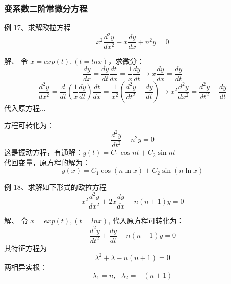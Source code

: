 \begin{frame}
\frametitle{变系数二阶常微分方程}
	\begin{exampleblock} 	{例 17、求解欧拉方程}
	\begin{equation*}
		x^2 \frac{d^2 y}{d x^2} +x \frac{d y}{d x} +n^2 y =0 
	\end{equation*}     
	\end{exampleblock}	
	\alert{解、}  令 $x=exp(t) , (t=ln x)$，求微分：\\
	\begin{equation*}
		\frac{d y}{d x}  = 	\frac{d y}{d t}\frac{d t}{d x}= \frac{1}{ x}\frac{d y}{d t}  \to x \frac{d y}{d x}=	\frac{d y}{d t}
    \end{equation*} 
	\begin{equation*}
		\frac{d ^2y}{d x^2}  = 	\frac{d }{d t} ( \frac{1}{ x}\frac{d y}{d t}  )\frac{d t}{d x}=  
		\frac{1}{ x^2}(\frac{d ^2y}{d t^2} -	\frac{d y}{d t})   \to  	x^2 \frac{d^2 y}{d x^2} = \frac{d ^2y}{d t^2} -	\frac{d y}{d t}
	\end{equation*} 
	代入原方程...
\end{frame}

\begin{frame}
	方程可转化为：
	\begin{equation*}
		\frac{d^2 y}{d t^2}  +n^2 y =0 
	\end{equation*}     
	这是振动方程，有通解：$	y(t)=C_1 \cos n t +C_2 \sin n t$ \\
	代回变量，原方程的解为：
	\begin{equation*}
		y(x)=C_1 \cos (n \ln x) +C_2 \sin (n \ln x)
	\end{equation*}    
\end{frame}

\begin{frame}
	\begin{exampleblock} {例 18、求解如下形式的欧拉方程}
	\begin{equation*}
		x^2 \frac{d^2 y}{d x^2} +2x \frac{d y}{d x} -n(n+1) y =0 
	\end{equation*}     
	\end{exampleblock}
	\alert{解、} 	令 $x=exp(t) , (t=ln x) $, 代入原方程可转化为：
	\begin{equation*}
		\frac{d^2 y}{d t^2}  +\frac{dy}{dt}-n(n+1) y =0 
	\end{equation*}     
	其特征方程为
	\begin{equation*}
		\lambda^2 +\lambda -n(n+1) =0	
	\end{equation*}    
	两相异实根：
	\begin{equation*}
		\lambda_1=n, ~~~\lambda_2= -(n+1)
	\end{equation*}  
\end{frame}

